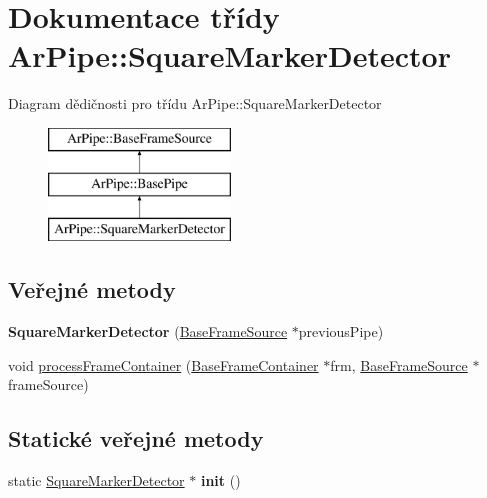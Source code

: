 \hypertarget{class_ar_pipe_1_1_square_marker_detector}{\section{Dokumentace třídy Ar\-Pipe\-:\-:Square\-Marker\-Detector}
\label{d1/d0f/class_ar_pipe_1_1_square_marker_detector}
}
Diagram dědičnosti pro třídu Ar\-Pipe\-:\-:Square\-Marker\-Detector\begin{figure}[H]
\begin{center}
\leavevmode
\includegraphics[height=3.000000cm]{d1/d0f/class_ar_pipe_1_1_square_marker_detector}
\end{center}
\end{figure}
\subsection*{Veřejné metody}
\begin{DoxyCompactItemize}
\item 
\hypertarget{class_ar_pipe_1_1_square_marker_detector_a29fcbdaf7a5783c427d0962c798239bc}{{\bfseries Square\-Marker\-Detector} (\hyperlink{class_ar_pipe_1_1_base_frame_source}{Base\-Frame\-Source} $\ast$previous\-Pipe)}\label{d1/d0f/class_ar_pipe_1_1_square_marker_detector_a29fcbdaf7a5783c427d0962c798239bc}

\item 
void \hyperlink{class_ar_pipe_1_1_square_marker_detector_aab270ab9b57d8a1429562565c1cc2965}{process\-Frame\-Container} (\hyperlink{class_ar_pipe_1_1_base_frame_container}{Base\-Frame\-Container} $\ast$frm, \hyperlink{class_ar_pipe_1_1_base_frame_source}{Base\-Frame\-Source} $\ast$frame\-Source)
\end{DoxyCompactItemize}
\subsection*{Statické veřejné metody}
\begin{DoxyCompactItemize}
\item 
\hypertarget{class_ar_pipe_1_1_square_marker_detector_adedf817c2685712f3bcb05edeeb599ae}{static \hyperlink{class_ar_pipe_1_1_square_marker_detector}{Square\-Marker\-Detector} $\ast$ {\bfseries init} ()}\label{d1/d0f/class_ar_pipe_1_1_square_marker_detector_adedf817c2685712f3bcb05edeeb599ae}

\end{DoxyCompactItemize}
